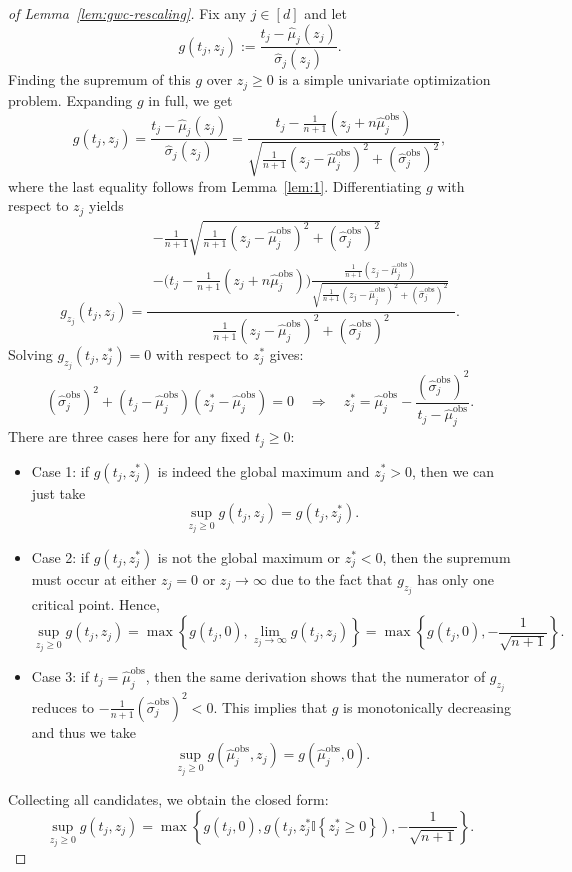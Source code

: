 \begin{proof}[of Lemma~\ref{lem:gwc-rescaling}]
Fix any $j\in [d]$ and let
\[
g(t_j, z_j) := \frac{t_j - \hat{\mu}_{j}(z_j)}{\hat{\sigma}_{j}(z_j)}.
\]
Finding the supremum of this $g$ over $z_j \geq 0$ is a simple univariate optimization problem. Expanding $g$ in full, we get
\[
g(t_j, z_j) = \frac{t_j - \hat{\mu}_{j}(z_j)}{\hat{\sigma}_{j}(z_j)} = \frac{t_j-\frac{1}{n+1}(z_j+n\hat{\mu}^\mathrm{obs}_j)}{\sqrt{\frac{1}{n+1}(z_j-\hat{\mu}^\mathrm{obs}_j)^2+(\hat{\sigma}^\mathrm{obs}_j)^2}},
\]
where the last equality follows from Lemma~\ref{lem:1}.
Differentiating $g$ with respect to $z_j$ yields
\[
g_{z_j}(t_j, z_j) = 
\frac{\begin{gathered}
-\tfrac{1}{n+1}\sqrt{\frac{1}{n+1}(z_j-\hat{\mu}^\mathrm{obs}_j)^2+(\hat{\sigma}^\mathrm{obs}_j)^2}\\
- \big(t_j - \tfrac{1}{n+1}(z_j+n\hat{\mu}^\mathrm{obs}_j)\big)\tfrac{\tfrac{1}{n+1}(z_j-\hat{\mu}^\mathrm{obs}_j)}{\sqrt{\frac{1}{n+1}(z_j-\hat{\mu}^\mathrm{obs}_j)^2+(\hat{\sigma}^\mathrm{obs}_j)^2}}
\end{gathered}}
{\frac{1}{n+1}(z_j-\hat{\mu}^\mathrm{obs}_j)^2+(\hat{\sigma}^\mathrm{obs}_j)^2}.
\]
Solving $g_{z_j}(t_j,z^*_j)=0$ with respect to $z^*_j$ gives:
\[
(\hat{\sigma}^\mathrm{obs}_j)^2 + (t_j-\hat{\mu}^\mathrm{obs}_j)(z^*_j-\hat{\mu}^\mathrm{obs}_j)=0
\quad\Longrightarrow\quad
z^\ast_j = \hat{\mu}^\mathrm{obs}_j - \frac{(\hat{\sigma}^\mathrm{obs}_j)^2}{t_j-\hat{\mu}^\mathrm{obs}_j}.
\]
There are three cases here for any fixed $t_j\geq 0$:
\begin{itemize}
    \item Case 1: if $g(t_j, z^\ast_j)$ is indeed the global maximum and $z^\ast_j > 0$, then we can just take
    \[
    \sup_{z_j \geq 0} g(t_j, z_j) = g(t_j, z^\ast_j).
    \]
    \item Case 2: if $g(t_j, z^\ast_j)$ is not the global maximum or $z^\ast_j < 0$, then the supremum must occur at either $z_j = 0$ or $z_j \rightarrow \infty$ due to the fact that $g_{z_j}$ has only one critical point. Hence,
    \[
    \sup_{z_j \geq 0} g(t_j, z_j) = \max\left\{g(t_j, 0), \lim_{z_j\to\infty} g(t_j,z_j)\right\} = \max\left\{g(t_j, 0), -\frac{1}{\sqrt{n+1}}\right\} .
    \]
    \item Case 3: if $t_j = \hat{\mu}^\mathrm{obs}_j$, then the same derivation shows that the numerator of $g_{z_j}$ reduces to $-\tfrac{1}{n+1}(\hat{\sigma}^\mathrm{obs}_j)^2 < 0$. This implies that $g$ is monotonically decreasing and thus we take
    \[
    \sup_{z_j \geq 0} g(\hat{\mu}^\mathrm{obs}_j, z_j) = g(\hat{\mu}^\mathrm{obs}_j, 0).
    \]
\end{itemize}

Collecting all candidates, we obtain the closed form:
\[
\sup_{z_j \geq 0} g(t_j, z_j)
=\max\left\{g\left(t_j, 0\right), g\left(t_j, z^*_j\mathbb{I}\left\{z^*_j \geq 0\right\}\right), -\frac{1}{\sqrt{n+1}}\right\}.
\]
\end{proof}


